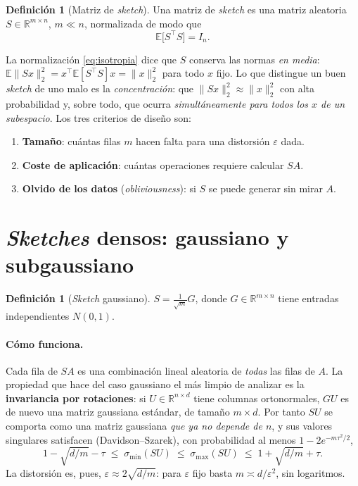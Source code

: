 \documentclass[11pt,a4paper,oneside]{book}
\theoremstyle{definition}
\newtheorem{definicion}[teorema]{Definición}
\theoremstyle{remark}
\newcommand{\R}{\mathbb{R}}
\newcommand{\E}{\mathbb{E}}
\newcommand{\T}{^{\top}}
\newcommand{\eps}{\varepsilon}
\newcommand{\nrm}[1]{\lVert #1\rVert}
\begin{document}
\begin{definicion}[Matriz de \emph{sketch}]\label{def:sketch}
Una matriz de \emph{sketch} es una matriz aleatoria $S\in\R^{m\times n}$, $m\ll n$, normalizada de modo que
\begin{equation}\label{eq:isotropia}
  \E\bigl[S\T S\bigr]=I_n .
\end{equation}
\end{definicion}

La normalización \eqref{eq:isotropia} dice que $S$ conserva las normas \emph{en media}:
$\E\nrm{Sx}_2^2=x\T\E[S\T S]x=\nrm{x}_2^2$ para todo $x$ fijo. Lo que distingue un buen \emph{sketch} de uno malo
es la \emph{concentración}: que $\nrm{Sx}_2^2\approx\nrm{x}_2^2$ con alta probabilidad y, sobre todo, que
ocurra \emph{simultáneamente para todos los $x$ de un subespacio}. Los tres criterios de diseño son:
\begin{enumerate}
  \item \textbf{Tamaño}: cuántas filas $m$ hacen falta para una distorsión $\eps$ dada.
  \item \textbf{Coste de aplicación}: cuántas operaciones requiere calcular $SA$.
  \item \textbf{Olvido de los datos} (\emph{obliviousness}): si $S$ se puede generar sin mirar $A$.
\end{enumerate}

\section{\emph{Sketches} densos: gaussiano y subgaussiano}

\begin{definicion}[\emph{Sketch} gaussiano]
$S=\frac{1}{\sqrt m}G$, donde $G\in\R^{m\times n}$ tiene entradas independientes $N(0,1)$.
\end{definicion}

\paragraph{Cómo funciona.} Cada fila de $SA$ es una combinación lineal aleatoria de \emph{todas} las filas de
$A$. La propiedad que hace del caso gaussiano el más limpio de analizar es la \textbf{invariancia por
rotaciones}: si $U\in\R^{n\times d}$ tiene columnas ortonormales, $GU$ es de nuevo una matriz gaussiana
estándar, de tamaño $m\times d$. Por tanto $SU$ se comporta como una matriz gaussiana \emph{que ya no
depende de $n$}, y sus valores singulares satisfacen (Davidson--Szarek), con probabilidad al menos $1-2e^{-m\tau^2/2}$,
\begin{equation}\label{eq:gauss-sv}
  1-\sqrt{d/m}-\tau\;\le\;\sigma_{\min}(SU)\;\le\;\sigma_{\max}(SU)\;\le\;1+\sqrt{d/m}+\tau .
\end{equation}
La distorsión es, pues, $\eps\approx2\sqrt{d/m}$: para $\eps$ fijo basta $m\asymp d/\eps^2$, sin logaritmos.
\end{document}
